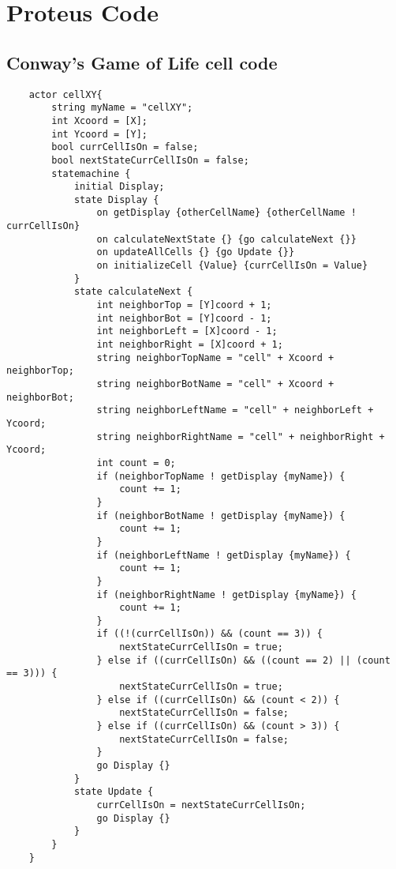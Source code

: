 \chapter{Proteus Code}\label{app:ProtCode}

\section{Conway's Game of Life cell code}\label{sec:ProtCGoL}

\begin{verbatim}
    actor cellXY{
        string myName = "cellXY";
        int Xcoord = [X];
        int Ycoord = [Y];
        bool currCellIsOn = false;
        bool nextStateCurrCellIsOn = false;
        statemachine {
            initial Display;
            state Display {
                on getDisplay {otherCellName} {otherCellName ! currCellIsOn}
                on calculateNextState {} {go calculateNext {}}
                on updateAllCells {} {go Update {}}
                on initializeCell {Value} {currCellIsOn = Value}
            }
            state calculateNext {
                int neighborTop = [Y]coord + 1;
                int neighborBot = [Y]coord - 1;
                int neighborLeft = [X]coord - 1;
                int neighborRight = [X]coord + 1;
                string neighborTopName = "cell" + Xcoord + neighborTop;
                string neighborBotName = "cell" + Xcoord + neighborBot;
                string neighborLeftName = "cell" + neighborLeft + Ycoord;
                string neighborRightName = "cell" + neighborRight + Ycoord;
                int count = 0;
                if (neighborTopName ! getDisplay {myName}) {
                    count += 1;
                }
                if (neighborBotName ! getDisplay {myName}) {
                    count += 1;
                }
                if (neighborLeftName ! getDisplay {myName}) {
                    count += 1;
                }
                if (neighborRightName ! getDisplay {myName}) {
                    count += 1;
                }
                if ((!(currCellIsOn)) && (count == 3)) {
                    nextStateCurrCellIsOn = true;
                } else if ((currCellIsOn) && ((count == 2) || (count == 3))) {
                    nextStateCurrCellIsOn = true;
                } else if ((currCellIsOn) && (count < 2)) {
                    nextStateCurrCellIsOn = false;
                } else if ((currCellIsOn) && (count > 3)) {
                    nextStateCurrCellIsOn = false;
                }
                go Display {}
            }
            state Update {
                currCellIsOn = nextStateCurrCellIsOn;
                go Display {}
            }
        }
    }
\end{verbatim}

